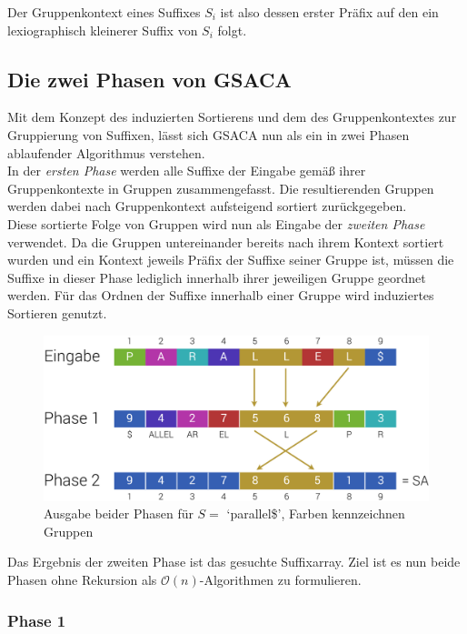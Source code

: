 \documentclass[twoside,a4paper,11pt]{article}
\theoremstyle{break}
\begin{document}
Der Gruppenkontext eines Suffixes $S_i$ ist also dessen erster Präfix auf den ein lexiographisch kleinerer Suffix von $S_i$ folgt.

\subsection{Die zwei Phasen von GSACA}

Mit dem Konzept des induzierten Sortierens und dem des Gruppenkontextes zur Gruppierung von Suffixen, lässt sich GSACA nun als ein in zwei Phasen ablaufender Algorithmus verstehen. \\

In der \textit{ersten Phase} werden alle Suffixe der Eingabe gemäß ihrer Gruppenkontexte in Gruppen zusammengefasst. Die resultierenden Gruppen werden dabei nach Gruppenkontext aufsteigend sortiert zurückgegeben. \\

Diese sortierte Folge von Gruppen wird nun als Eingabe der \textit{zweiten Phase} verwendet. Da die Gruppen untereinander bereits nach ihrem Kontext sortiert wurden und ein Kontext jeweils Präfix der Suffixe seiner Gruppe ist, müssen die Suffixe in dieser Phase lediglich innerhalb ihrer jeweiligen Gruppe geordnet werden. Für das Ordnen der Suffixe innerhalb einer Gruppe wird induziertes Sortieren genutzt.

\begin{figure}[h]
	\centering
	\includegraphics[width=0.7\linewidth,bb=0 0 874 376]{./assets/twoPhases.pdf}
	\caption{Ausgabe beider Phasen für $S =$ `parallel\$', Farben kennzeichnen Gruppen}
\label{fig:twoPhases}
\end{figure}

Das Ergebnis der zweiten Phase ist das gesuchte Suffixarray. Ziel ist es nun beide Phasen ohne Rekursion als $\mathcal{O}(n)$-Algorithmen zu formulieren.

\subsubsection{Phase 1}
\end{document}
